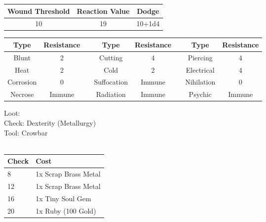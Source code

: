 \bigbreak
\begin{minipage}[H]{1\textwidth}
	\centering
	\begin{tabular}[c]{|c | c | c|}
		\hline
		Wound Threshold & Reaction Value & Dodge\\
		\hline
		10 & 19 & 10+1d4\\
		\hline
	\end{tabular}
\end{minipage}
\bigbreak
\noindent
\begin{minipage}[H]{1\textwidth}
	\centering
	\begin{tabular}[c]{|c | c | c | c | c | c | c | c|}  
		\hline
		Type & Resistance && Type & Resistance && Type & Resistance\\
		\hline
		Blunt & 2 && 
		Cutting & 4 && 
		Piercing & 4\\
		Heat & 2 && 
		Cold & 2 && 
		Electrical & 4\\
		Corrosion & 0 && 
		Suffocation & Immune && 
		Nihilation & 0 \\
		Necrose & Immune && 
		Radiation & Immune && 
		Psychic & Immune\\
		\hline
	\end{tabular}
\end{minipage}
\bigbreak
\noindent
Loot:\\
Check: Dexterity (Metallurgy)\\
Tool: Crowbar\\
\\
\begin{minipage}{0.8\textwidth}
	\begin{tabular}{|l | l|}
		\hline
		Check & Cost\\
		\hline
		8 & 1x Scrap Brass Metal\\
		12 & 1x Scrap Brass Metal\\
		16 & 1x Tiny Soul Gem\\
		20 & 1x Ruby (100 Gold)\\
		\hline
	\end{tabular}
\end{minipage}
\pagebreak